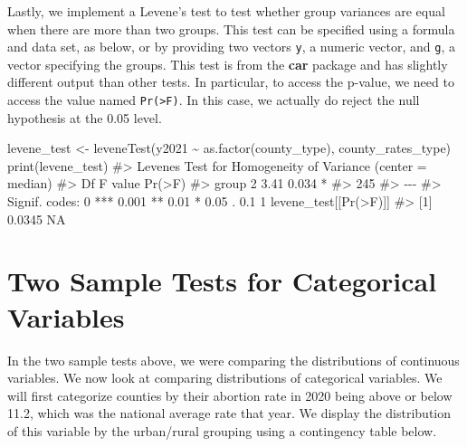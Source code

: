 \documentclass[
  letterpaper,
]{krantz}
\makeatletter
\newenvironment{Shaded}{\begin{snugshade}}{\end{snugshade}}
\newcommand{\CommentTok}[1]{\textcolor[rgb]{0.37,0.37,0.37}{#1}}
\newcommand{\FunctionTok}[1]{\textcolor[rgb]{0.28,0.35,0.67}{#1}}
\newcommand{\NormalTok}[1]{\textcolor[rgb]{0.00,0.23,0.31}{#1}}
\newcommand{\OtherTok}[1]{\textcolor[rgb]{0.00,0.23,0.31}{#1}}
\newcommand{\SpecialCharTok}[1]{\textcolor[rgb]{0.37,0.37,0.37}{#1}}
\newcommand{\StringTok}[1]{\textcolor[rgb]{0.13,0.47,0.30}{#1}}
\newenvironment{kframe}{%
\medskip{}
\setlength{\fboxsep}{.8em}
 \def\at@end@of@kframe{}%
 \ifinner\ifhmode%
  \def\at@end@of@kframe{\end{minipage}}%
  \begin{minipage}{\columnwidth}%
 \fi\fi%
 \def\FrameCommand##1{\hskip\@totalleftmargin \hskip-\fboxsep
 \colorbox{shadecolor}{##1}\hskip-\fboxsep
     \hskip-\linewidth \hskip-\@totalleftmargin \hskip\columnwidth}%
 \MakeFramed {\advance\hsize-\width
   \@totalleftmargin\z@ \linewidth\hsize
   \@setminipage}}%
 {\par\unskip\endMakeFramed%
 \at@end@of@kframe}
\renewenvironment{Shaded}{\begin{kframe}}{\end{kframe}}
\makeatother
\begin{document}
Lastly, we implement a Levene's test to test whether group variances are
equal when there are more than two groups. This test can be specified
using a formula and data set, as below, or by providing two vectors
\texttt{y}, a numeric vector, and \texttt{g}, a vector specifying the
groups. This test is from the \textbf{car} package and has slightly
different output than other tests. In particular, to access the p-value,
we need to access the value named
\texttt{\textquotesingle{}Pr(\textgreater{}F)\textquotesingle{}}. In
this case, we actually do reject the null hypothesis at the 0.05 level.

\begin{Shaded}
\begin{Highlighting}[]
\NormalTok{levene\_test }\OtherTok{\textless{}{-}} \FunctionTok{leveneTest}\NormalTok{(y2021 }\SpecialCharTok{\textasciitilde{}} \FunctionTok{as.factor}\NormalTok{(county\_type), }
\NormalTok{                              county\_rates\_type)}
\FunctionTok{print}\NormalTok{(levene\_test)}
\CommentTok{\#\textgreater{} Levene\textquotesingle{}s Test for Homogeneity of Variance (center = median)}
\CommentTok{\#\textgreater{}        Df F value Pr(\textgreater{}F)  }
\CommentTok{\#\textgreater{} group   2    3.41  0.034 *}
\CommentTok{\#\textgreater{}       245                 }
\CommentTok{\#\textgreater{} {-}{-}{-}}
\CommentTok{\#\textgreater{} Signif. codes:  0 \textquotesingle{}***\textquotesingle{} 0.001 \textquotesingle{}**\textquotesingle{} 0.01 \textquotesingle{}*\textquotesingle{} 0.05 \textquotesingle{}.\textquotesingle{} 0.1 \textquotesingle{} \textquotesingle{} 1}
\NormalTok{levene\_test[[}\StringTok{\textquotesingle{}Pr(\textgreater{}F)\textquotesingle{}}\NormalTok{]]}
\CommentTok{\#\textgreater{} [1] 0.0345     NA}
\end{Highlighting}
\end{Shaded}

\hypertarget{two-sample-tests-for-categorical-variables}{%
\section{Two Sample Tests for Categorical
Variables}\label{two-sample-tests-for-categorical-variables}}

In the two sample tests above, we were comparing the distributions of
continuous variables. We now look at comparing distributions of
categorical variables. We will first categorize counties by their
abortion rate in 2020 being above or below 11.2, which was the national
average rate that year. We display the distribution of this variable by
the urban/rural grouping using a contingency table below.
\end{document}
